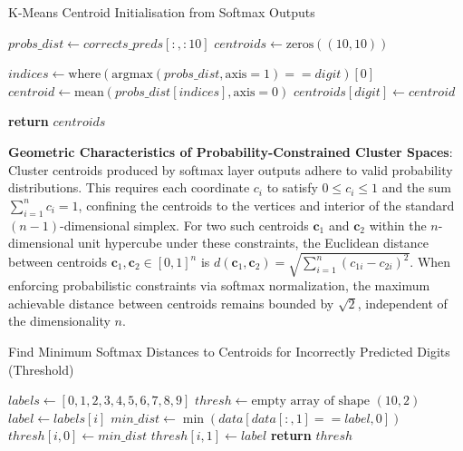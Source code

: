 \begin{algorithm}
\caption{K-Means Centroid Initialisation from Softmax Outputs}
\label{alg:k-means-centroid-init} 
\begin{algorithmic}[1]

\State $probs\_dist \gets corrects\_preds[:, :10]$ 
\State $centroids \gets \text{zeros}((10, 10))$ 

\State $indices \gets \text{where}(\text{argmax}(probs\_dist, \text{axis}=1) == digit)[0]$ 
\State $centroid \gets \text{mean}(probs\_dist[indices], \text{axis}=0)$ 
\State $centroids[digit] \gets centroid$ 
\EndFor

\State \textbf{return} $centroids$
\end{algorithmic}
\end{algorithm}


\textbf{Geometric Characteristics of Probability-Constrained Cluster Spaces}: Cluster centroids produced by  softmax layer outputs adhere to valid probability distributions. This requires each coordinate \( c_i \) to satisfy \( 0 \leq c_i \leq 1 \) and the sum \( \sum_{i=1}^n c_i = 1 \), confining the centroids to the vertices and interior of the standard \((n-1)\)-dimensional simplex. For two such centroids \( \mathbf{c}_1 \) and \( \mathbf{c}_2 \) within the \( n \)-dimensional unit hypercube under these constraints, the Euclidean distance between centroids \( \mathbf{c}_1, \mathbf{c}_2 \in [0,1]^n \) is \( d(\mathbf{c}_1, \mathbf{c}_2) = \sqrt{\sum_{i=1}^{n}\left(c_{1i} - c_{2i}\right)^2} \). When enforcing probabilistic constraints via softmax normalization, the maximum achievable distance between centroids remains bounded by \(\sqrt{2}\), independent of the dimensionality \( n \).

\begin{algorithm}
\caption{Find Minimum Softmax Distances to Centroids for Incorrectly Predicted Digits (Threshold)}
\label{alg:min_distance} 
\begin{algorithmic}[1]
    \State $labels \gets [0, 1, 2, 3, 4, 5, 6, 7, 8, 9]$
    \State $thresh \gets \text{empty array of shape } (10, 2)$
        \State $label \gets labels[i]$
        \State $min\_dist \gets \min(data[data[:, 1] == label, 0])$
        \State $thresh[i, 0] \gets min\_dist$
        \State $thresh[i, 1] \gets label$
    \EndFor
    \State \textbf{return} $thresh$
\EndProcedure
\end{algorithmic}
\end{algorithm}

